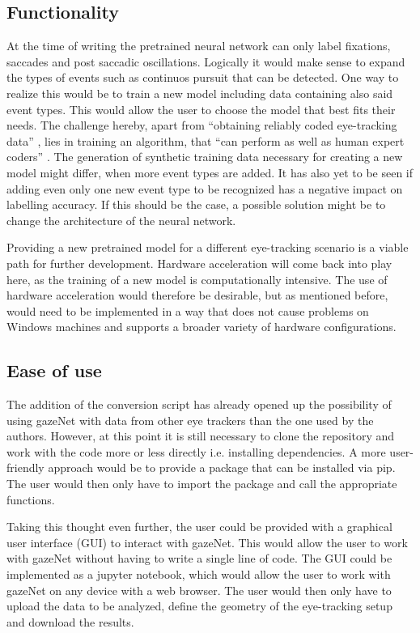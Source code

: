 \documentclass[acmlarge]{acmart}
\begin{document}
\subsection{Functionality}
At the time of writing the pretrained neural network can only label fixations, saccades and post saccadic oscillations. Logically it would make sense to expand the types of events such as continuos pursuit that can be detected. One way to realize this would be to train a new model including data containing also said event types. This would allow the user to choose the model that best fits their needs. The challenge hereby, apart from ``obtaining reliably coded eye-tracking data'' \cite{zemblys2018gazeNet}, lies in training an algorithm, that ``can perform as well as human expert coders'' \cite{zemblys2018gazeNet}. The generation of synthetic training data necessary for creating a new model might differ, when more event types are added. It has also yet to be seen if adding even only one new event type to be recognized has a negative impact on labelling accuracy. If this should be the case, a possible solution might be to change the architecture of the neural network.

Providing a new pretrained model for a different eye-tracking scenario is a viable path for further development. Hardware acceleration will come back into play here, as the training of a new model is computationally intensive. The use of hardware acceleration would therefore be desirable, but as mentioned before, would need to be implemented in a way that does not cause problems on Windows machines and supports a broader variety of hardware configurations.


\subsection{Ease of use}
The addition of the conversion script has already opened up the possibility of using gazeNet with data from other eye trackers than the one used by the authors. However, at this point it is still necessary to clone the repository and work with the code more or less directly i.e. installing dependencies. A more user-friendly approach would be to provide a package that can be installed via pip. The user would then only have to import the package and call the appropriate functions.

Taking this thought even further, the user could be provided with a graphical user interface (GUI) to interact with gazeNet. This would allow the user to work with gazeNet without having to write a single line of code. The GUI could be implemented as a jupyter notebook, which would allow the user to work with gazeNet on any device with a web browser. The user would then only have to upload the data to be analyzed, define the geometry of the eye-tracking setup and download the results.
\end{document}
